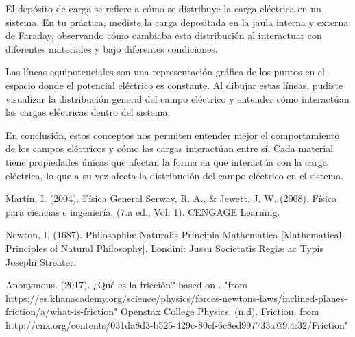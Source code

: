 \documentclass{article}
\begin{document}
El depósito de carga se refiere a cómo se distribuye la carga eléctrica en un sistema. En tu práctica, mediste la carga depositada en la jaula interna y externa de Faraday, observando cómo cambiaba esta distribución al interactuar con diferentes materiales y bajo diferentes condiciones.

Las líneas equipotenciales son una representación gráfica de los puntos en el espacio donde el potencial eléctrico es constante. Al dibujar estas líneas, pudiste visualizar la distribución general del campo eléctrico y entender cómo interactúan las cargas eléctricas dentro del sistema.

En conclusión, estos conceptos nos permiten entender mejor el comportamiento de los campos eléctricos y cómo las cargas interactúan entre sí. Cada material tiene propiedades únicas que afectan la forma en que interactúa con la carga eléctrica, lo que a su vez afecta la distribución del campo eléctrico en el sistema.

\begin{thebibliography}{9}						%
		Martín, I. (2004). Física General
		Serway, R. A., $\&$ Jewett, J. W. (2008). Física para ciencias e ingeniería. (7.a
ed., Vol. 1). CENGAGE Learning.

	Newton, I. (1687). Philosophiæ Naturalis Principia Mathematica [Mathematical Principles of Natural Philosophy]. Londini: Jussu Societatis Regiæ ac Typis Josephi Streater.

	Anonymous. (2017). ¿Qué es la fricción? based on \cite{Openstax College Physics}. "from https://es.khanacademy.org/science/physics/forces-newtons-laws/inclined-planes-friction/a/what-is-friction"
		Openstax College Physics. (n.d). Friction. from http://cnx.org/contents/031da8d3-b525-429c-80cf-6c8ed997733a@9,4:32/Friction"

\end{thebibliography}
\end{document}
